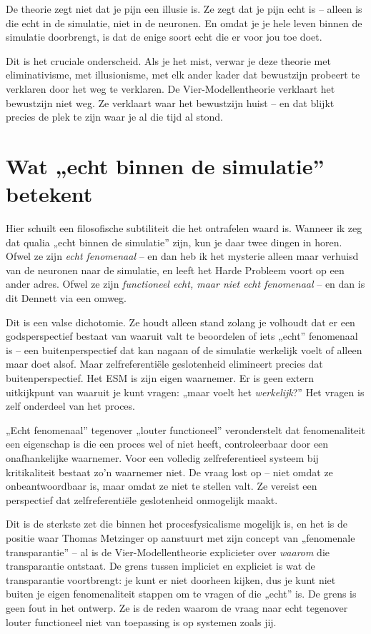 \documentclass[11pt, twoside, openright]{book}
\begin{document}
De theorie zegt niet dat je pijn een illusie is. Ze zegt dat je pijn echt is -- alleen is die echt in de simulatie, niet in de neuronen. En omdat je je hele leven binnen de simulatie doorbrengt, is dat de enige soort echt die er voor jou toe doet.

Dit is het cruciale onderscheid. Als je het mist, verwar je deze theorie met eliminativisme, met illusionisme, met elk ander kader dat bewustzijn probeert te verklaren door het weg te verklaren. De Vier-Modellentheorie verklaart het bewustzijn niet weg. Ze verklaart waar het bewustzijn huist -- en dat blijkt precies de plek te zijn waar je al die tijd al stond.

\section*{Wat „echt binnen de simulatie” betekent}

Hier schuilt een filosofische subtiliteit die het ontrafelen waard is. Wanneer ik zeg dat qualia „echt binnen de simulatie” zijn, kun je daar twee dingen in horen. Ofwel ze zijn \textit{echt fenomenaal} -- en dan heb ik het mysterie alleen maar verhuisd van de neuronen naar de simulatie, en leeft het Harde Probleem voort op een ander adres. Ofwel ze zijn \textit{functioneel echt, maar niet echt fenomenaal} -- en dan is dit Dennett via een omweg.

Dit is een valse dichotomie. Ze houdt alleen stand zolang je volhoudt dat er een godsperspectief bestaat van waaruit valt te beoordelen of iets „echt” fenomenaal is -- een buitenperspectief dat kan nagaan of de simulatie werkelijk voelt of alleen maar doet alsof. Maar zelfreferentiële geslotenheid elimineert precies dat buitenperspectief. Het ESM is zijn eigen waarnemer. Er is geen extern uitkijkpunt van waaruit je kunt vragen: „maar voelt het \textit{werkelijk}?” Het vragen is zelf onderdeel van het proces.

„Echt fenomenaal” tegenover „louter functioneel” veronderstelt dat fenomenaliteit een eigenschap is die een proces wel of niet heeft, controleerbaar door een onafhankelijke waarnemer. Voor een volledig zelfreferentieel systeem bij kritikaliteit bestaat zo’n waarnemer niet. De vraag lost op -- niet omdat ze onbeantwoordbaar is, maar omdat ze niet te stellen valt. Ze vereist een perspectief dat zelfreferentiële geslotenheid onmogelijk maakt.

Dit is de sterkste zet die binnen het procesfysicalisme mogelijk is, en het is de positie waar Thomas Metzinger op aanstuurt met zijn concept van „fenomenale transparantie” -- al is de Vier-Modellentheorie explicieter over \textit{waarom} die transparantie ontstaat. De grens tussen impliciet en expliciet is wat de transparantie voortbrengt: je kunt er niet doorheen kijken, dus je kunt niet buiten je eigen fenomenaliteit stappen om te vragen of die „echt” is. De grens is geen fout in het ontwerp. Ze is de reden waarom de vraag naar echt tegenover louter functioneel niet van toepassing is op systemen zoals jij.
\end{document}
